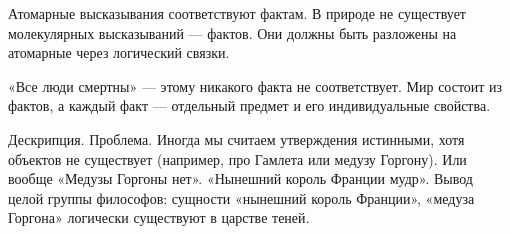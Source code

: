 Атомарные высказывания соответствуют фактам.
В природе не существует молекулярных высказываний --- фактов. Они должны быть разложены на атомарные через логический связки.                                         

«Все люди смертны» --- этому никакого факта не соответствует. Мир состоит из фактов, а каждый факт --- отдельный предмет и его индивидуальные свойства.

Дескрипция.
Проблема. Иногда мы считаем утверждения истинными, хотя объектов не существует (например, про Гамлета или медузу Горгону). Или вообще «Медузы Горгоны нет».
«Нынешний король Франции мудр». Вывод целой группы философов: сущности «нынешний король Франции», «медуза Горгона» логически существуют в царстве теней.
